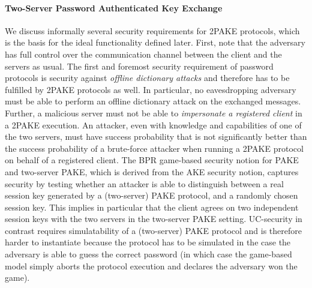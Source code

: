 \paragraph{Two-Server Password Authenticated Key Exchange}
We discuss informally several security requirements for 2PAKE protocols, which is the basis for the ideal functionality \FTWOPAKE defined later.
First, note that the adversary has full control over the communication channel between the client and the servers as usual.
The first and foremost security requirement of password protocols is security against \emph{offline dictionary attacks} and therefore has to be fulfilled by 2PAKE protocols as well.
In particular, no eavesdropping adversary must be able to perform an offline dictionary attack on the exchanged messages.
Further, a malicious server must not be able to \emph{impersonate a registered client} in a 2PAKE execution.
An attacker, even with knowledge and capabilities of one of the two servers, must have success probability that is not significantly better than the success probability of a brute-force attacker when running a 2PAKE protocol on behalf of a registered client.
The BPR game-based security notion for PAKE and two-server PAKE, which is derived from the AKE security notion, captures security by testing whether an attacker is able to distinguish between a real session key generated by a (two-server) PAKE protocol, and a randomly chosen session key.
This implies in particular that the client agrees on two independent session keys with the two servers in the two-server PAKE setting.
UC-security in contrast requires simulatability of a (two-server) PAKE protocol and is therefore harder to instantiate because the protocol has to be simulated in the case the adversary is able to guess the correct password (in which case the game-based model simply aborts the protocol execution and declares the adversary won the game).


